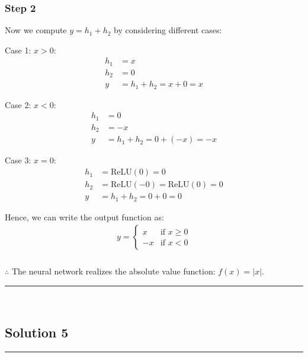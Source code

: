 \documentclass{article}
\begin{document}
\subsubsection*{Step 2}
\parbox{\textwidth}{
Now we compute $y = h_1 + h_2$ by considering different cases:

Case 1: $x > 0$:
\begin{align*}
h_1 &= x \\
h_2 &= 0 \\
y &= h_1 + h_2 = x + 0 = x
\end{align*}

Case 2: $x < 0$:
\begin{align*}
h_1 &= 0 \\
h_2 &= -x \\
y &= h_1 + h_2 = 0 + (-x) = -x
\end{align*}

Case 3: $x = 0$:
\begin{align*}
h_1 &= \text{ReLU}(0) = 0 \\
h_2 &= \text{ReLU}(-0) = \text{ReLU}(0) = 0 \\
y &= h_1 + h_2 = 0 + 0 = 0
\end{align*}

Hence, we can write the output function as:
\begin{align*}
y = \begin{cases}
x & \text{if } x \geq 0 \\
-x & \text{if } x < 0
\end{cases}
\end{align*}
}

\subsubsection*{\normalfont}{$\therefore$ The neural network realizes the absolute value function: $f(x) = |x|$.}

\noindent\rule{\textwidth}{0.4pt}\\

\newpage

\subsection*{Solution 5}
\noindent\rule{\textwidth}{0.4pt}\\
\end{document}
